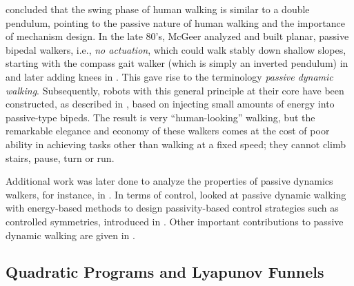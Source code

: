 \cite{Mochon1980} concluded that the swing phase of human walking is similar to a double pendulum, pointing to the passive nature of human walking and the importance of mechanism design.
%
In the late 80's, McGeer analyzed and built planar, passive bipedal walkers, i.e., {\em no actuation}, which could walk stably down shallow slopes, starting with the compass gait walker (which is simply an inverted pendulum) in \cite{McGeer1990} and later adding knees in \cite{McGeer1990a}.
%
This gave rise to the terminology {\em passive dynamic walking}.
%
Subsequently, robots with this general principle at their core have been constructed, as described in \cite{Collins2005}, based on injecting small amounts of energy into passive-type bipeds.
%
The result is very ``human-looking'' walking, but the remarkable elegance and economy of these walkers comes at the cost of poor ability in achieving tasks other than walking at a fixed speed; they cannot climb stairs, pause, turn or run.
%

Additional work was later done to analyze the properties of passive dynamics walkers, for instance, in \cite{Espiau1994,Garcia1998,Borzova2004}.
%
In terms of control, \cite{Spong1999} looked at passive dynamic walking with energy-based methods to design passivity-based control strategies such as controlled symmetries, introduced in \cite{Spong2005}.
%
%
%
Other important contributions to passive dynamic walking are given in
\cite{Kuo1999,Kuo2002,Anderson2005,Wisse2007}.
%

\subsection{Quadratic Programs and Lyapunov Funnels}


